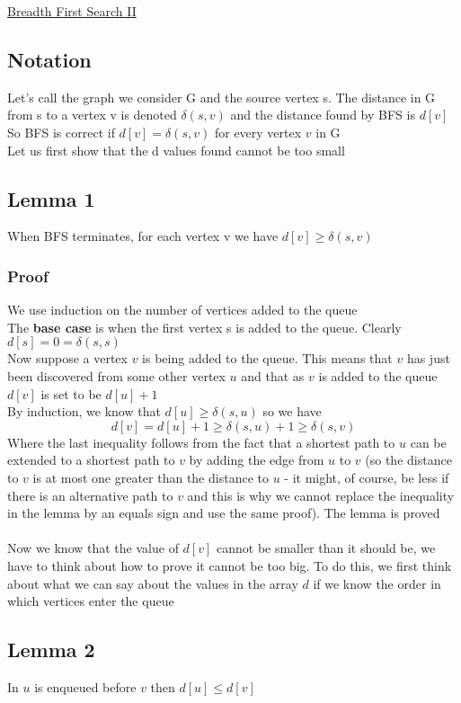 \documentclass{article}[18pt]
\begin{document}
\begin{center}
\underline{\huge Breadth First Search II}
\end{center}
\subsection{Notation}
Let's call the graph we consider G and the source vertex s. The distance in G from s to a vertex v is denoted $\delta(s,v)$ and the distance found by BFS is $d[v]$\\
So BFS is correct if $d[v]=\delta(s,v)$ for every vertex $v$ in G\\
Let us first show that the d values found cannot be too small
\subsection{Lemma 1}
When BFS terminates, for each vertex v we have $d[v]\geqslant \delta(s,v)$
\subsubsection{Proof}
We use induction on the number of vertices added to the queue\\
The \textbf{base case} is when the first vertex s is added to the queue. Clearly $d[s]=0=\delta(s,s)$\\
Now suppose a vertex $v$ is being added to the queue. This means that $v$ has just been discovered from some other vertex $u$ and that as $v$ is added to the queue $d[v]$ is set to be $d[u]+1$\\
By induction, we know that $d[u]\geqslant \delta (s,u)$ so we have
$$d [ v ] = d [ u ] + 1 \geq \delta ( s , u ) + 1 \geq \delta ( s , v )$$
Where the last inequality follows from the fact that a shortest path to $u$ can be extended to a shortest path to $v$ by adding the edge from $u$ to $v$ (so the distance to $v$ is at most one greater than the distance to $u$ - it might, of course, be less if there is an alternative path to $v$ and this is why we cannot replace the inequality in the lemma by an equals sign and use the same proof). The lemma is proved\\
\\
Now we know that the value of $d[v]$ cannot be smaller than it should be, we have to think about how to prove it cannot be too big. To do this, we first think about what we can say about the values in the array $d$ if we know the order in which vertices enter the queue
\subsection{Lemma 2}
In $u$ is enqueued before $v$ then $d[u]\leqslant d[v]$
\end{document}
